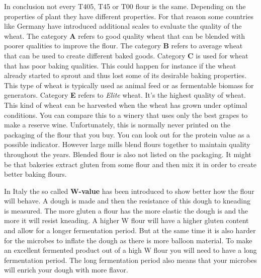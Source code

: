 In conclusion not every T405, T45 or T00 flour is the same. Depending on the properties
of plant they have different properties. For that reason some countries like
Germany have introduced additional scales to evaluate the quality of the
wheat. The category \textbf{A} refers to good quality wheat that can be blended
with poorer qualities to improve the flour. The category \textbf{B} refers to
average wheat that can be used to create different baked goods. Category \textbf{C}
is used for wheat that has poor baking qualities. This could happen for instance
if the wheat already started to sprout and thus lost some of its desirable
baking properties. This type of wheat is typically used as animal feed or
as fermentable biomass for generators. Category \textbf{E} refers to \textit{Elite} wheat. It's
the highest quality of wheat. This kind of wheat can be harvested when the
wheat has grown under optimal conditions. You can compare this to a winery
that uses only the best grapes to make a reserve wine. Unfortunately, this is normally never printed
on the packaging of the flour that you buy. You can look out for the protein
value as a possible indicator. However large mills blend flours together to
maintain quality throughout the years. Blended flour is also not listed on
the packaging. It might be that bakeries extract gluten from some flour and
then mix it in order to create better baking flours.

In Italy the so called
\textbf{W-value} has been introduced to show better how the flour will behave.
A dough is made and then the resistance of this dough to kneading is measured.
The more gluten a flour has the more elastic the dough is and the more it will
resist kneading. A higher W flour will have a higher gluten content and allow for a longer
fermentation period. But at the same time it is also harder for the microbes to
inflate the dough as there is more balloon material. To make an excellent fermented
product out of a high W flour you will need to have a long fermentation period.
The long fermentation period also means that your microbes will enrich
your dough with more flavor.

